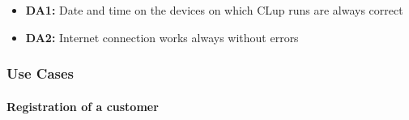 \documentclass{article}
\begin{document}
\begin{itemize}
\begin{itemize}
				\item {\bfseries DA1:} Date and time on the devices on which CLup runs are always correct
				\item {\bfseries DA2:} Internet connection works always without errors
\newpage

				\end{itemize}

			\end{itemize}

		\subsubsection{Use Cases}
		

			
			\paragraph{Registration of a customer}
			
\end{document}
